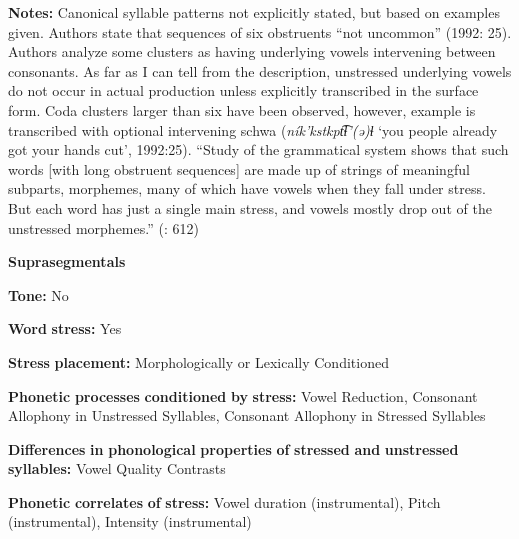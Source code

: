 \documentclass[output=paper]{langsci/langscibook}
\begin{document}
\begin{styleBody}
\textbf{Notes:} Canonical syllable patterns not explicitly stated, but based on examples given. Authors state that sequences of six obstruents “not uncommon” (1992: 25). Authors analyze some clusters as having underlying vowels intervening between consonants. As far as I can tell from the description, unstressed underlying vowels do not occur in actual production unless explicitly transcribed in the surface form. Coda clusters larger than six have been observed, however, example is transcribed with optional intervening schwa (\textit{ník’kstkpt͡ɬ’(ə)ɬ} ‘you people already got your hands cut’, 1992:25). “Study of the grammatical system shows that such words [with long obstruent sequences] are made up of strings of meaningful subparts, morphemes, many of which have vowels when they fall under stress. But each word has just a single main stress, and vowels mostly drop out of the unstressed morphemes.” (\citealt{ThompsonEtAl1996}: 612)
\end{styleBody}

\begin{styleBody}
\textbf{Suprasegmentals}
\end{styleBody}

\begin{styleBody}
\textbf{Tone:} No
\end{styleBody}

\begin{styleBody}
\textbf{Word} \textbf{stress:} Yes
\end{styleBody}

\begin{styleBody}
\textbf{Stress} \textbf{placement:} Morphologically or Lexically Conditioned
\end{styleBody}

\begin{styleBody}
\textbf{Phonetic} \textbf{processes} \textbf{conditioned} \textbf{by} \textbf{stress:} Vowel Reduction, Consonant Allophony in Unstressed Syllables, Consonant Allophony in Stressed Syllables
\end{styleBody}

\begin{styleBody}
\textbf{Differences} \textbf{in} \textbf{phonological} \textbf{properties} \textbf{of} \textbf{stressed} \textbf{and} \textbf{unstressed} \textbf{syllables:} Vowel Quality Contrasts
\end{styleBody}

\begin{styleBody}
\textbf{Phonetic} \textbf{correlates} \textbf{of} \textbf{stress:} Vowel duration (instrumental), Pitch (instrumental), Intensity (instrumental)
\end{styleBody}
\end{document}
